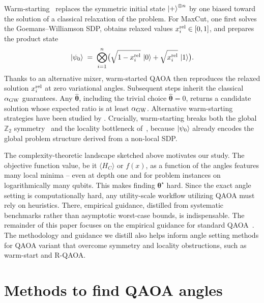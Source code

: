 \documentclass[twocolumn,
english,
aps,
pra,
10pt,
longbibliography,
superscriptaddress,
amsmath,
amssymb,
floatfix
]{revtex4-2}
\begin{document}
Warm-starting~\cite{Egger2021warmstartingquantum} replaces the symmetric initial state $\ket{+}^{\otimes n}$ by one biased toward the solution of a classical relaxation of the problem.
For MaxCut, one first solves the Goemans--Williamson SDP, obtains relaxed values $x_i^{\rm rel}\in[0,1]$, and prepares the product state
\begin{equation}
\ket{\psi_0}\;=\;\bigotimes_{i=1}^{n}\bigl(\sqrt{1-x_i^{\rm rel}}\,\ket{0}+\sqrt{x_i^{\rm rel}}\,\ket{1}\bigr).
\label{eq:psi0}
\end{equation}
Thanks to an alternative mixer, warm-started QAOA then reproduces the relaxed solution $x_i^{\rm rel}$ at zero variational angles. 
Subsequent steps inherit the classical $\alpha_{\rm GW}$ guarantees.
Any $\hat{\boldsymbol{\theta}}$, including the trivial choice $\hat{\boldsymbol{\theta}}=0$, returns a candidate solution whose expected ratio is at least $\alpha_{\rm GW}$.
Alternative warm-starting strategies have been studied by \cite{tate2023warm,truger2024warm,tate2025warm}.
Crucially, warm-starting breaks both the global $\mathbb{Z}_2$ symmetry~\cite{Bravyi2020} 
and the locality bottleneck of~\cite{BravyiKlieschKoenigTang2022, BarakMarwaha2022}, because $\ket{\psi_0}$ already encodes the global problem structure derived from a non-local SDP.

The complexity-theoretic landscape sketched above motivates our study. 
The objective function value, be it $\langle H_C\rangle$ or $f(x)$, as a function of the angles features many local minima -- even at depth one and for problem instances on logarithmically many qubits.
This makes finding $\boldsymbol{\theta}^\star$ hard.
Since the exact angle setting is computationally hard, any utility-scale workflow utilizing QAOA must rely on heuristics.
There, empirical guidance, distilled from systematic benchmarks rather than asymptotic worst-case bounds, is indispensable.
The remainder of this paper focuses on the empirical guidance for standard QAOA~\cite{Farhi2014}.
The methodology and guidance we distill also helps inform angle setting methods for QAOA variant that overcome symmetry and locality obstructions, such as warm-start and R-QAOA.


\section{Methods to find QAOA angles\label{sec:back}}
\end{document}
